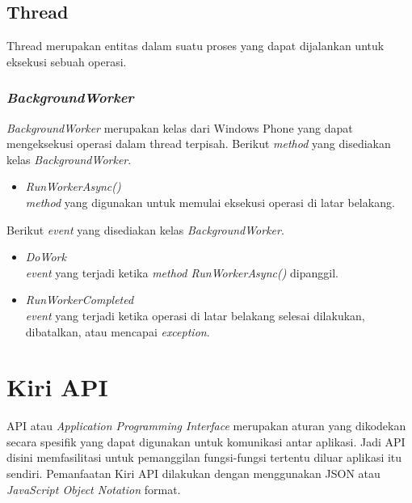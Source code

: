 \subsection{Thread}
\label{subsec:Thread}
\hspace{0.5cm} Thread merupakan entitas dalam suatu proses yang dapat dijalankan untuk eksekusi sebuah operasi. 

\subsubsection{\textit{BackgroundWorker}}
\label{subsubsec:BackgroundWorker}
\hspace{0.5cm} \textit{BackgroundWorker} merupakan kelas dari Windows Phone yang dapat mengeksekusi operasi dalam thread terpisah. Berikut \textit{method} yang disediakan kelas \textit{BackgroundWorker}.
\begin{itemize}
	\item \textit{RunWorkerAsync()} \\
	\textit{method} yang digunakan untuk memulai eksekusi operasi di latar belakang.
\end{itemize}

Berikut \textit{event} yang disediakan kelas \textit{BackgroundWorker}.
\begin{itemize}
	\item \textit{DoWork} \\
	\textit{event} yang terjadi ketika \textit{method RunWorkerAsync()} dipanggil.
	\item \textit{RunWorkerCompleted} \\
	\textit{event} yang terjadi ketika operasi di latar belakang selesai dilakukan, dibatalkan, atau mencapai \textit{exception}.
\end{itemize}

\section{Kiri API}
\label{sec:Kiri API}
\hspace{0.5cm} API atau \textit{Application Programming Interface} merupakan aturan yang dikodekan secara spesifik yang dapat digunakan untuk komunikasi antar aplikasi. Jadi API disini memfasilitasi untuk pemanggilan fungsi-fungsi tertentu diluar aplikasi itu sendiri. Pemanfaatan Kiri API dilakukan dengan menggunakan JSON atau \textit{JavaScript Object Notation} format. 

